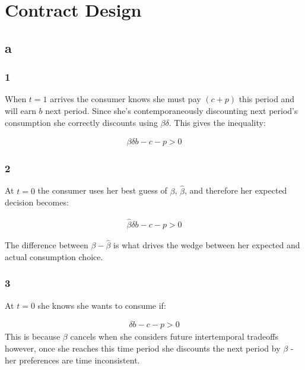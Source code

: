 \documentclass{article}
\begin{document}
   

\section{Contract Design}



\subsection*{a}
\subsubsection*{1}

When $t=1$ arrives the consumer knows she must pay $(c+p)$ this period and will 
earn $b$ next period. Since she's contemporaneously discounting next period's 
consumption she correctly discounts using $\beta \delta$. This gives the 
inequality:

\begin{align*}
    \beta \delta b -c - p > 0
\end{align*}



\subsubsection*{2}
At $t=0$ the consumer uses her best guess of $\beta$, $\hat{\beta}$, and therefore
her expected decision becomes:

\begin{align*}
   \hat{\beta} \delta b - c - p > 0 
\end{align*}


The difference between $\beta -\hat{\beta}$ is what drives the wedge between her 
expected and actual consumption choice.



\subsubsection*{3}


At $t=0$ she knows she wants to consume if:

\begin{align*}
    \delta b - c - p > 0
\end{align*}
This is because $\beta$ cancels when she considers future intertemporal tradeoffs 
however, once she reaches this time period she discounts the next period by $\beta$ -
her preferences are time inconsistent.
\end{document}
